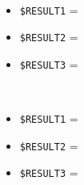 \documentclass[../../Sperimentazione.tex]{subfiles}
\begin{document}
\begin{tcolorbox}[fonttitle=\bfseries, 
								adjusted title={\Large Prova 4A.1}, 
								breakable, 
								sharp corners=south,
								colback=white, 
								colframe=white!60!black]
\begin{description}[leftmargin=0.7cm,labelwidth=!]
\begin{description}
        					\item[\dispositivoA] \ \par
        					\begin{itemize}
        						\item \verb|$RESULT1| = \ok
        						\item \verb|$RESULT2| = \ok
        						\item \verb|$RESULT3| = \ok
        					\end{itemize}      					
        					
        					\item[\dispositivoB] \ \par
        					\begin{itemize}
        						\item \verb|$RESULT1| = \ok
        						\item \verb|$RESULT2| = \ok
        						\item \verb|$RESULT3| = \ok
        					\end{itemize}
        					
        				\end{description}
        				
        				
				\end{description}  
				
			\end{tcolorbox}



	
	\newpage	
\end{document}
